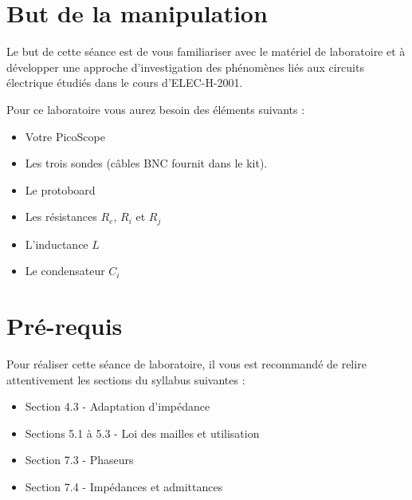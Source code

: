 \pagestyle{fancy}
\cfoot{}
\usepackage{placeins}



\setlength{\parskip}{0.5cm plus4mm minus3mm} %
\setlength{\parindent}{0pt}




\section{But de la manipulation}
Le but de cette séance est de vous familiariser avec le matériel de laboratoire et à développer une approche d'investigation des phénomènes liés aux circuits électrique étudiés dans le cours d'ELEC-H-2001.

Pour ce laboratoire vous aurez besoin des éléments suivants :
\begin{itemize}
    \item Votre PicoScope
    \item Les trois sondes (câbles BNC fournit dans le kit).
    \item Le protoboard
    \item Les résistances $R_e$, $R_i$ et $R_j$
    \item L'inductance $L$
    \item Le condensateur $C_i$
\end{itemize}

\section{Pré-requis}
Pour réaliser cette séance de laboratoire, il vous est recommandé de relire attentivement les sections du syllabus suivantes :
\begin{itemize}
    \item Section 4.3 - Adaptation d'impédance
    \item Sections 5.1 à 5.3 - Loi des mailles et utilisation
    \item Section 7.3 - Phaseurs
    \item Section 7.4 - Impédances et admittances
\end{itemize}

